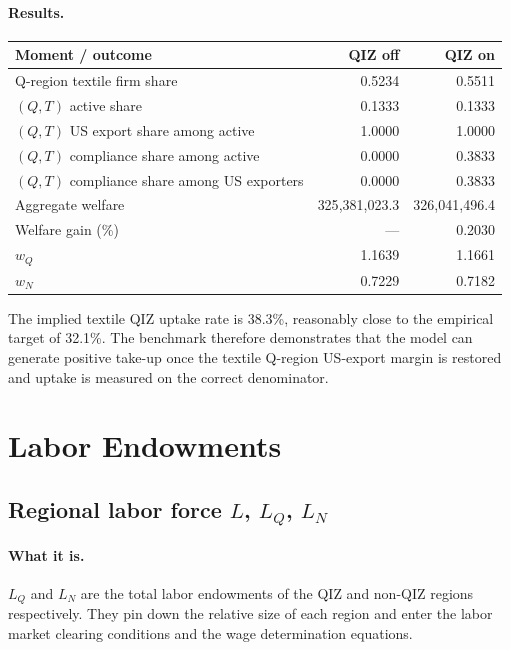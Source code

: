 \documentclass[12pt]{article}
\begin{document}
\paragraph{Results.}
\begin{center}
\begin{tabular}{lrr}
\toprule
Moment / outcome & QIZ off & QIZ on \\
\midrule
Q-region textile firm share & 0.5234 & 0.5511 \\
$(Q,T)$ active share & 0.1333 & 0.1333 \\
$(Q,T)$ US export share among active & 1.0000 & 1.0000 \\
$(Q,T)$ compliance share among active & 0.0000 & 0.3833 \\
$(Q,T)$ compliance share among US exporters & 0.0000 & 0.3833 \\
Aggregate welfare & 325{,}381{,}023.3 & 326{,}041{,}496.4 \\
Welfare gain (\%) & --- & 0.2030 \\
$w_Q$ & 1.1639 & 1.1661 \\
$w_N$ & 0.7229 & 0.7182 \\
\bottomrule
\end{tabular}
\end{center}

\noindent The implied textile QIZ uptake rate is 38.3\%, reasonably close to
the empirical target of 32.1\%. The benchmark therefore demonstrates that the
model can generate positive take-up once the textile Q-region US-export margin
is restored and uptake is measured on the correct denominator.

\section{Labor Endowments}

\subsection{Regional labor force $L$, $L_Q$, $L_N$}

\paragraph{What it is.}
$L_Q$ and $L_N$ are the total labor endowments of the QIZ and non-QIZ
regions respectively. They pin down the relative size of each region and
enter the labor market clearing conditions and the wage determination
equations.
\end{document}
